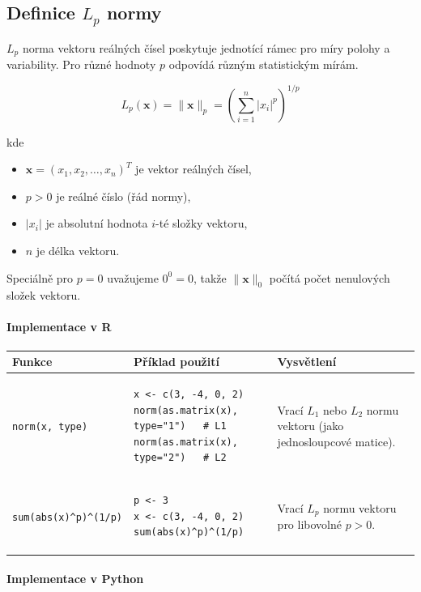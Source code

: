 \documentclass[a4paper, 11pt]{article}
\newenvironment{funkcedict}
{%
  \begingroup
  \renewcommand{\arraystretch}{1.4}%
  \lstset{basicstyle=\ttfamily\small, columns=fullflexible}%
  \setlength{\tabcolsep}{4pt}%
  \begin{tabular}{p{0.19\textwidth} p{0.38\textwidth} p{0.30\textwidth}}
  \textbf{Funkce} & \textbf{Příklad použití} & \textbf{Vysvětlení} \\
  \midrule
}
{%
  \end{tabular}%
  \endgroup
}
\begin{document}
\subsection{Definice $L_p$ normy}

$L_p$ norma vektoru reálných čísel poskytuje jednotící rámec pro míry polohy
a variability. Pro různé hodnoty $p$ odpovídá různým statistickým mírám.

\begin{equation*}
	L_p(\mathbf{x}) = \|\mathbf{x}\|_p = \left(\sum_{i=1}^{n} |x_i|^p\right)^{1/p}
\end{equation*}

kde

\begin{itemize}[noitemsep]
	\item $\mathbf{x} = (x_1, x_2, \ldots, x_n)^T$ je vektor reálných čísel,
	\item $p > 0$ je reálné číslo (řád normy),
	\item $|x_i|$ je absolutní hodnota $i$-té složky vektoru,
	\item $n$ je délka vektoru.
\end{itemize}

Speciálně pro $p = 0$ uvažujeme $0^0 = 0$, takže $\|\mathbf{x}\|_0$ počítá počet nenulových složek vektoru.

\paragraph{Implementace v R}\mbox{}\par

\begin{funkcedict}
	\texttt{norm(x, type)} &
	\begin{lstlisting}
x <- c(3, -4, 0, 2)
norm(as.matrix(x), type="1")   # L1
norm(as.matrix(x), type="2")   # L2
	\end{lstlisting}
	&
	Vrací $L_1$ nebo $L_2$ normu vektoru (jako jednosloupcové matice). \\
	\texttt{sum(abs(x)\^{}p)\^{}(1/p)} &
	\begin{lstlisting}
p <- 3
x <- c(3, -4, 0, 2)
sum(abs(x)^p)^(1/p)
	\end{lstlisting}
	&
	Vrací $L_p$ normu vektoru pro libovolné $p > 0$. \\
\end{funkcedict}

\paragraph{Implementace v Python}\mbox{}\par
\end{document}

